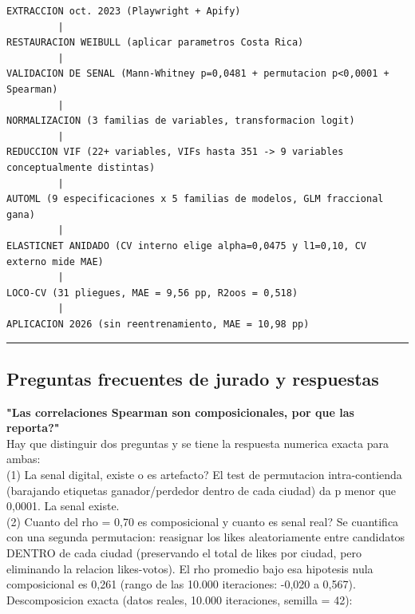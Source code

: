 \documentclass[11pt,a4paper]{article}
\begin{document}
{{\begin{lstlisting}
EXTRACCION oct. 2023 (Playwright + Apify)
         |
RESTAURACION WEIBULL (aplicar parametros Costa Rica)
         |
VALIDACION DE SENAL (Mann-Whitney p=0,0481 + permutacion p<0,0001 + Spearman)
         |
NORMALIZACION (3 familias de variables, transformacion logit)
         |
REDUCCION VIF (22+ variables, VIFs hasta 351 -> 9 variables conceptualmente distintas)
         |
AUTOML (9 especificaciones x 5 familias de modelos, GLM fraccional gana)
         |
ELASTICNET ANIDADO (CV interno elige alpha=0,0475 y l1=0,10, CV externo mide MAE)
         |
LOCO-CV (31 pliegues, MAE = 9,56 pp, R2oos = 0,518)
         |
APLICACION 2026 (sin reentrenamiento, MAE = 10,98 pp)
\end{lstlisting}

\vspace{4pt}\noindent\rule{\linewidth}{0.4pt}\vspace{4pt}

\subsection{Preguntas frecuentes de jurado y respuestas}

\textbf{"Las correlaciones Spearman son composicionales, por que las reporta?"}\\[2pt]
Hay que distinguir dos preguntas y se tiene la respuesta numerica exacta para ambas:\\[2pt]

(1) La senal digital, existe o es artefacto? El test de permutacion intra-contienda (barajando etiquetas ganador/perdedor dentro de cada ciudad) da p menor que 0,0001. La senal existe.\\[2pt]

(2) Cuanto del rho = 0,70 es composicional y cuanto es senal real? Se cuantifica con una segunda permutacion: reasignar los likes aleatoriamente entre candidatos DENTRO de cada ciudad (preservando el total de likes por ciudad, pero eliminando la relacion likes-votos). El rho promedio bajo esa hipotesis nula composicional es 0,261 (rango de las 10.000 iteraciones: -0,020 a 0,567).\\[2pt]

Descomposicion exacta (datos reales, 10.000 iteraciones, semilla = 42):\\[2pt]

}}
\end{document}
